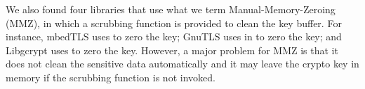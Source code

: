 We also found four libraries that use what we term Manual-Memory-Zeroing (MMZ), in which a scrubbing function is provided to clean the key buffer. 
For instance, \textsf{\small mbedTLS} uses  to zero the key; \textsf{\small GnuTLS} uses  in  to zero the key; and \textsf{\small Libgcrypt} uses  to zero the key. However, a major problem for MMZ is that it does not clean the sensitive data automatically and it may leave the crypto key in memory if the scrubbing function is not invoked.


    



